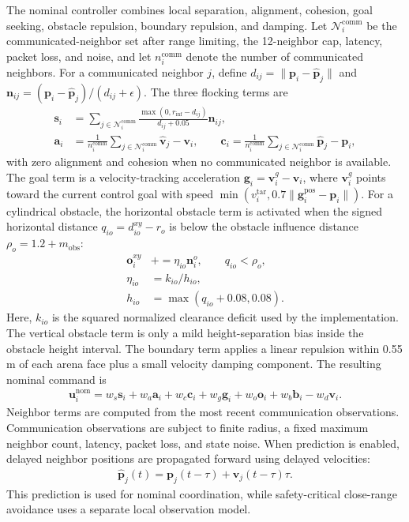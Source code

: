 \documentclass[11pt]{article}
\begin{document}
The nominal controller combines local separation, alignment, cohesion, goal seeking, obstacle repulsion, boundary repulsion, and damping. Let $\mathcal{N}^{\mathrm{comm}}_i$ be the communicated-neighbor set after range limiting, the 12-neighbor cap, latency, packet loss, and noise, and let $n_i^{\mathrm{comm}}$ denote the number of communicated neighbors. For a communicated neighbor $j$, define $d_{ij}=\|\mathbf{p}_i-\hat{\mathbf{p}}_j\|$ and $\mathbf{n}_{ij}=(\mathbf{p}_i-\hat{\mathbf{p}}_j)/(d_{ij}+\epsilon)$. The three flocking terms are
\begin{align}
    \mathbf{s}_i &=
    \sum_{j\in\mathcal{N}^{\mathrm{comm}}_i}
    \frac{\max(0,r_{\mathrm{inf}}-d_{ij})}{d_{ij}+0.05}\mathbf{n}_{ij},\\
    \mathbf{a}_i &=
    \frac{1}{n_i^{\mathrm{comm}}}
    \sum_{j\in\mathcal{N}^{\mathrm{comm}}_i}\hat{\mathbf{v}}_j-\mathbf{v}_i,\qquad
    \mathbf{c}_i =
    \frac{1}{n_i^{\mathrm{comm}}}
    \sum_{j\in\mathcal{N}^{\mathrm{comm}}_i}\hat{\mathbf{p}}_j-\mathbf{p}_i ,
\end{align}
with zero alignment and cohesion when no communicated neighbor is available. The goal term is a velocity-tracking acceleration $\mathbf{g}_i=\mathbf{v}^{g}_i-\mathbf{v}_i$, where $\mathbf{v}^{g}_i$ points toward the current control goal with speed $\min(v^{\mathrm{tar}}_i,0.7\|\mathbf{g}^{\mathrm{pos}}_i-\mathbf{p}_i\|)$. For a cylindrical obstacle, the horizontal obstacle term is activated when the signed horizontal distance $q_{io}=d_{io}^{xy}-r_o$ is below the obstacle influence distance $\rho_o=1.2+m_{\mathrm{obs}}$:
\begin{align}
    \mathbf{o}^{xy}_i &\mathrel{+}=
    \eta_{io}\mathbf{n}^{o}_{i},\qquad q_{io}<\rho_o,\\
    \eta_{io} &= k_{io}/h_{io},\\
    h_{io} &= \max(q_{io}+0.08,0.08) .
\end{align}
Here, $k_{io}$ is the squared normalized clearance deficit used by the implementation. The vertical obstacle term is only a mild height-separation bias inside the obstacle height interval. The boundary term applies a linear repulsion within 0.55 m of each arena face plus a small velocity damping component. The resulting nominal command is
\begin{align}
    \mathbf{u}^{\mathrm{nom}}_i =
    w_s \mathbf{s}_i + w_a \mathbf{a}_i + w_c \mathbf{c}_i +
    w_g \mathbf{g}_i + w_o \mathbf{o}_i + w_b \mathbf{b}_i -
    w_d \mathbf{v}_i .
\end{align}
Neighbor terms are computed from the most recent communication observations. Communication observations are subject to finite radius, a fixed maximum neighbor count, latency, packet loss, and state noise. When prediction is enabled, delayed neighbor positions are propagated forward using delayed velocities:
\begin{align}
    \hat{\mathbf{p}}_j(t) =
    \mathbf{p}_j(t-\tau) + \mathbf{v}_j(t-\tau)\tau .
\end{align}
This prediction is used for nominal coordination, while safety-critical close-range avoidance uses a separate local observation model.
\end{document}
